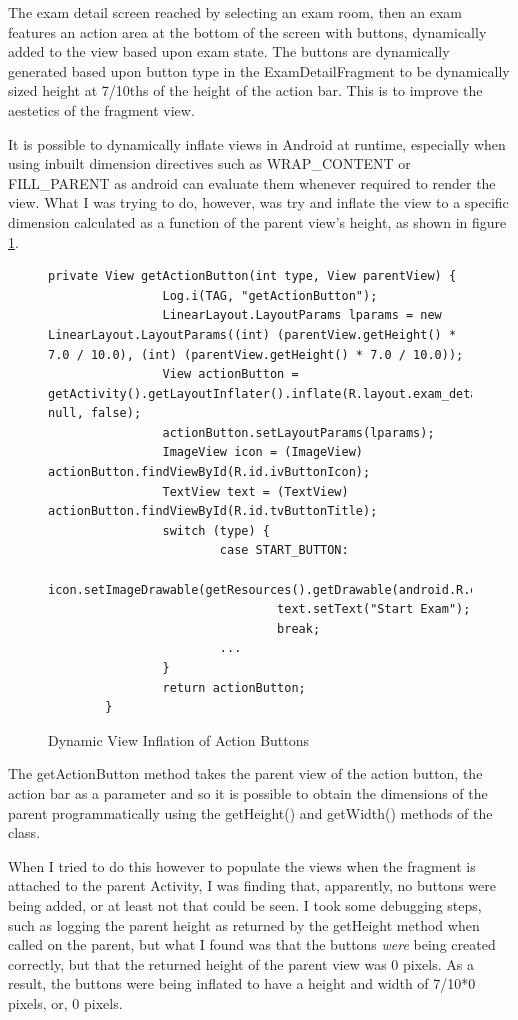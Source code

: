 The exam detail screen reached by selecting an exam room, then an exam features an action area at the bottom of the screen with buttons, dynamically added to the view based upon exam state.  The buttons are dynamically generated based upon button type in the ExamDetailFragment to be dynamically sized height at 7/10ths of the height of the action bar.  This is to improve the aestetics of the fragment view.

It is possible to dynamically inflate views in Android at runtime, especially when using inbuilt dimension directives such as WRAP\_CONTENT or FILL\_PARENT as android can evaluate them whenever required to render the view.  What I was trying to do, however, was try and inflate the view to a specific dimension calculated as a function of the parent view's height, as shown in figure \ref{fig:actionButtons}.

\FloatBarrier

\begin{figure}[!htpb]
	\centering
	\lstset{language=Java}
	\begin{lstlisting}[tabsize=2,breaklines=true]
	private View getActionButton(int type, View parentView) {
				Log.i(TAG, "getActionButton");
				LinearLayout.LayoutParams lparams = new LinearLayout.LayoutParams((int) (parentView.getHeight() * 7.0 / 10.0), (int) (parentView.getHeight() * 7.0 / 10.0));
				View actionButton = getActivity().getLayoutInflater().inflate(R.layout.exam_detail_action_button_layout, null, false);
				actionButton.setLayoutParams(lparams);
				ImageView icon = (ImageView) actionButton.findViewById(R.id.ivButtonIcon);
				TextView text = (TextView) actionButton.findViewById(R.id.tvButtonTitle);
				switch (type) {
						case START_BUTTON:
								icon.setImageDrawable(getResources().getDrawable(android.R.drawable.ic_media_play));
								text.setText("Start Exam");
								break;
						...
				}
				return actionButton;
		}
	\end{lstlisting}
	\caption{Dynamic View Inflation of Action Buttons}
	\label{fig:actionButtons}
\end{figure}

\FloatBarrier

The getActionButton method takes the parent view of the action button, the action bar as a parameter and so it is possible to obtain the dimensions of the parent programmatically using the getHeight() and getWidth() methods of the class.

When I tried to do this however to populate the views when the fragment is attached to the parent Activity, I was finding that, apparently, no buttons were being added, or at least not that could be seen.  I took some debugging steps, such as logging the parent height as returned by the getHeight method when called on the parent, but what I found was that the buttons \textit{were} being created correctly, but that the returned height of the parent view was 0 pixels.  As a result, the buttons were being inflated to have a height and width of 7/10*0 pixels, or, 0 pixels.

